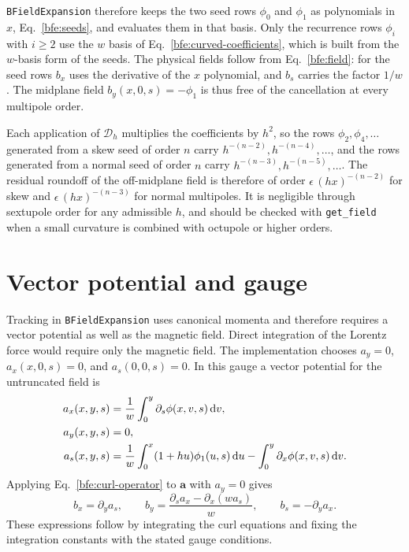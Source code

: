 \texttt{BFieldExpansion} therefore keeps the two seed rows \(\phi_0\) and
\(\phi_1\) as polynomials in \(x\), Eq.~\eqref{bfe:seeds}, and evaluates
them in that basis. Only the recurrence rows \(\phi_i\) with \(i\geq2\)
use the \(w\) basis of Eq.~\eqref{bfe:curved-coefficients}, which is
built from the \(w\)-basis form of the seeds. The physical fields follow
from Eq.~\eqref{bfe:field}: for the seed rows \(b_x\) uses the derivative
of the \(x\) polynomial, and \(b_s\) carries the factor \(1/w\). The
midplane field \(b_y(x,0,s)=-\phi_1\) is thus free of the cancellation at
every multipole order.

Each application of \(\mathcal D_h\) multiplies the coefficients by
\(h^2\), so the rows \(\phi_2,\phi_4,\ldots\) generated from a skew seed of
order \(n\) carry \(h^{-(n-2)},h^{-(n-4)},\ldots\), and the rows generated
from a normal seed of order \(n\) carry \(h^{-(n-3)},h^{-(n-5)},\ldots\).
The residual roundoff of the off-midplane field is therefore of order
\(\epsilon\,(hx)^{-(n-2)}\) for skew and \(\epsilon\,(hx)^{-(n-3)}\) for
normal multipoles. It is negligible through sextupole order for any
admissible \(h\), and should be checked with \texttt{get\_field} when a
small curvature is combined with octupole or higher orders.

\section{Vector potential and gauge}
\label{sec:magnetic-vector-potential}

Tracking in \texttt{BFieldExpansion} uses canonical momenta and therefore
requires a vector potential as well as the magnetic field. Direct
integration of the Lorentz force would require only the magnetic field.
The implementation chooses \(a_y=0\), \(a_x(x,0,s)=0\), and
\(a_s(0,0,s)=0\). In this gauge a vector potential for the untruncated
field is
\begin{align}
 a_x(x,y,s)&=\frac{1}{w}\int_0^y\partial_s\phi(x,v,s)\,\text{d} v,\\
 a_y(x,y,s)&=0,\\
 a_s(x,y,s)&=\frac{1}{w}\int_0^x(1+hu)\phi_1(u,s)\,\text{d} u
                -\int_0^y\partial_x\phi(x,v,s)\,\text{d} v.
 \label{bfe:vector-potential}
\end{align}
Applying Eq.~\eqref{bfe:curl-operator} to \(\bm a\) with \(a_y=0\) gives
\begin{equation}
 b_x=\partial_y a_s,\qquad
 b_y=\frac{\partial_s a_x-\partial_x(w a_s)}{w},\qquad
 b_s=-\partial_y a_x.
 \label{bfe:curl}
\end{equation}
These expressions follow by integrating the curl equations and fixing the
integration constants with the stated gauge conditions.

